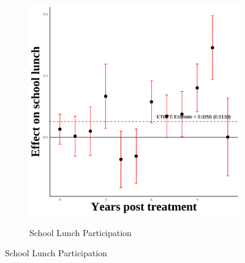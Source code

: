 \documentclass[12pt,english]{article}
\begin{document}
\begin{figure}[H]
\begin{subfigure}[b]{0.3\textwidth}
    \label{fig:ln-schl-lunch-third-four}
  \end{subfigure}
  \hfill
  \begin{subfigure}[b]{0.3\textwidth}
    \centering
    \caption{School Lunch Participation}
    \includegraphics[width=\linewidth]{figures/plot83-schl_lunch_event_study-third-four.png}
    \label{fig:schl-lunch-third-four}
  \end{subfigure}

  \vspace{0.3cm} %


\end{figure}
\end{document}
